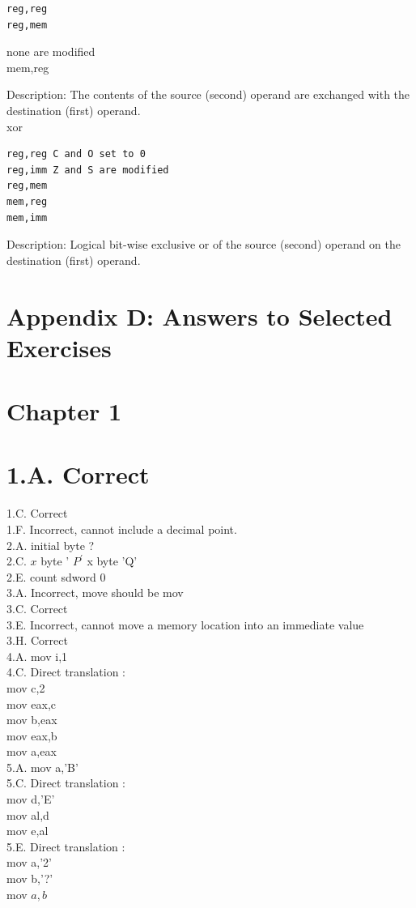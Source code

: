 \documentclass[10pt]{book}
\begin{document}
\begin{center}
\begin{center}
\begin{center}
\begin{center}
\begin{center}
\begin{verbatim}
reg,reg
reg,mem
\end{verbatim}

none are modified\\
mem,reg

Description: The contents of the source (second) operand are exchanged with the destination (first) operand.\\
xor

\begin{verbatim}
reg,reg C and O set to 0
reg,imm Z and S are modified
reg,mem
mem,reg
mem,imm
\end{verbatim}

Description: Logical bit-wise exclusive or of the source (second) operand on the destination (first) operand.

\section*{Appendix D: Answers to Selected Exercises}
\section*{Chapter 1}
\section*{1.A. Correct}
1.C. Correct\\
1.F. Incorrect, cannot include a decimal point.\\
2.A. initial byte ?\\
2.C. $x$ byte ' $P^{\prime}$ x byte 'Q'\\
2.E. count sdword 0\\
3.A. Incorrect, move should be mov\\
3.C. Correct\\
3.E. Incorrect, cannot move a memory location into an immediate value\\
3.H. Correct\\
4.A. mov i,1\\
4.C. Direct translation :\\
mov c,2\\
mov eax,c\\
mov b,eax\\
mov eax,b\\
mov a,eax\\
5.A. mov a,'B'\\
5.C. Direct translation :\\
mov d,'E'\\
mov al,d\\
mov e,al\\
5.E. Direct translation :\\
mov a,'2'\\
mov b,'?'\\
mov $a, b$


\end{center}
\end{center}
\end{center}
\end{center}
\end{center}
\end{document}
